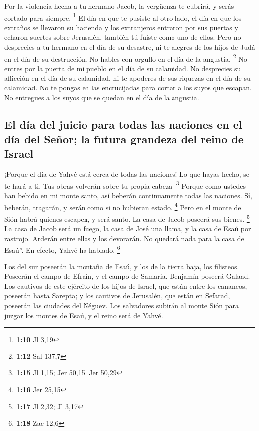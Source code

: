  Por la violencia hecha a tu hermano Jacob, la vergüenza
te cubrirá, y serás cortado para siempre. \footnote{\textbf{1:10} Jl
  3,19}  El día en que te pusiste al otro lado, el día en
que los extraños se llevaron su hacienda y los extranjeros entraron por
sus puertas y echaron suertes sobre Jerusalén, también tú fuiste como
uno de ellos.  Pero no desprecies a tu hermano en el día
de su desastre, ni te alegres de los hijos de Judá en el día de su
destrucción. No hables con orgullo en el día de la angustia. \footnote{\textbf{1:12}
  Sal 137,7}  No entres por la puerta de mi pueblo en el
día de su calamidad. No desprecies su aflicción en el día de su
calamidad, ni te apoderes de sus riquezas en el día de su calamidad.
 No te pongas en las encrucijadas para cortar a los suyos
que escapan. No entregues a los suyos que se quedan en el día de la
angustia.

\hypertarget{el-duxeda-del-juicio-para-todas-las-naciones-en-el-duxeda-del-seuxf1or-la-futura-grandeza-del-reino-de-israel}{%
\subsection{El día del juicio para todas las naciones en el día del
Señor; la futura grandeza del reino de
Israel}\label{el-duxeda-del-juicio-para-todas-las-naciones-en-el-duxeda-del-seuxf1or-la-futura-grandeza-del-reino-de-israel}}

 ¡Porque el día de Yahvé está cerca de todas las
naciones! Lo que hayas hecho, se te hará a ti. Tus obras volverán sobre
tu propia cabeza. \footnote{\textbf{1:15} Jl 1,15; Jer 50,15; Jer 50,29}
 Porque como ustedes han bebido en mi monte santo, así
beberán continuamente todas las naciones. Sí, beberán, tragarán, y serán
como si no hubieran estado. \footnote{\textbf{1:16} Jer 25,15}
 Pero en el monte de Sión habrá quienes escapen, y será
santo. La casa de Jacob poseerá sus bienes. \footnote{\textbf{1:17} Jl
  2,32; Jl 3,17}  La casa de Jacob será un fuego, la casa
de José una llama, y la casa de Esaú por rastrojo. Arderán entre ellos y
los devorarán. No quedará nada para la casa de Esaú''. En efecto, Yahvé
ha hablado. \footnote{\textbf{1:18} Zac 12,6}

 Los del sur poseerán la montaña de Esaú, y los de la
tierra baja, los filisteos. Poseerán el campo de Efraín, y el campo de
Samaria. Benjamín poseerá Galaad.  Los cautivos de este
ejército de los hijos de Israel, que están entre los cananeos, poseerán
hasta Sarepta; y los cautivos de Jerusalén, que están en Sefarad,
poseerán las ciudades del Néguev.  Los salvadores subirán
al monte Sión para juzgar los montes de Esaú, y el reino será de Yahvé.
